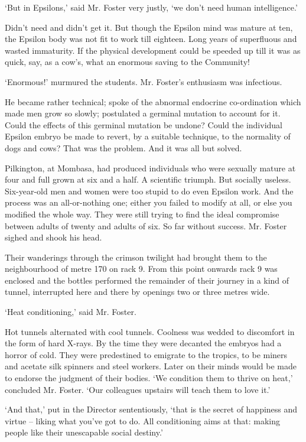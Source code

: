 \documentclass[12pt,a5paper]{book}
\newcommand{\sqm}[1]{‘#1’}
\begin{document}
\sqm{But in Epsilons,} said Mr. Foster very justly, \sqm{we don't need human intelligence.}

Didn't need and didn't get it. But though the Epsilon mind was mature at ten, the Epsilon body was not fit to work till eighteen. Long years of superfluous and wasted immaturity. If the physical development could be speeded up till it was as quick, say, as a cow's, what an enormous saving to the Community!

\sqm{Enormous!} murmured the students. Mr. Foster's enthusiasm was infectious.

He became rather technical; spoke of the abnormal endocrine co-ordination which made men grow so slowly; postulated a germinal mutation to account for it. Could the effects of this germinal mutation be undone? Could the individual Epsilon embryo be made to revert, by a suitable technique, to the normality of dogs and cows? That was the problem. And it was all but solved.

Pilkington, at Mombasa, had produced individuals who were sexually mature at four and full grown at six and a half. A scientific triumph. But socially useless. Six-year-old men and women were too stupid to do even Epsilon work. And the process was an all-or-nothing one; either you failed to modify at all, or else you modified the whole way. They were still trying to find the ideal compromise between adults of twenty and adults of six. So far without success. Mr. Foster sighed and shook his head.

Their wanderings through the crimson twilight had brought them to the neighbourhood of metre 170 on rack 9. From this point onwards rack 9 was enclosed and the bottles performed the remainder of their journey in a kind of tunnel, interrupted here and there by openings two or three metres wide.

\sqm{Heat conditioning,} said Mr. Foster.

Hot tunnels alternated with cool tunnels. Coolness was wedded to discomfort in the form of hard X-rays. By the time they were decanted the embryos had a horror of cold. They were predestined to emigrate to the tropics, to be miners and acetate silk spinners and steel workers. Later on their minds would be made to endorse the judgment of their bodies. \sqm{We condition them to thrive on heat,} concluded Mr. Foster. \sqm{Our colleagues upstairs will teach them to love it.}

\sqm{And that,} put in the Director sententiously, \sqm{that is the secret of happiness and virtue – liking what you've got to do. All conditioning aims at that: making people like their unescapable social destiny.}
\end{document}
